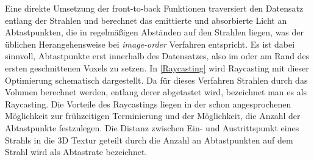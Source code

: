 \documentclass[a4paper,fontsize=12pt,toc=bib,parskip=half,ngerman]{scrartcl}
\begin{document}
Eine direkte Umsetzung der front-to-back Funktionen traversiert den Datensatz entlang der Strahlen und berechnet das emittierte und absorbierte Licht an Abtastpunkten, die in regelm\"a{\ss}igen Abst\"anden auf den Strahlen liegen, was der \"ublichen Herangehensweise bei \textit{image-order} Verfahren entspricht. Es ist dabei sinnvoll, Abtastpunkte erst innerhalb des Datensatzes, also im oder am Rand des ersten geschnittenen Voxels zu setzen. In \cref{Raycasting} wird Raycasting mit dieser Optimierung schematisch dargestellt. 
Da f\"ur dieses Verfahren Strahlen durch das Volumen berechnet werden, entlang derer abgetastet wird, bezeichnet man es als Raycasting. Die Vorteile des Raycastings liegen in der schon angesprochenen M\"oglichkeit zur fr\"uhzeitigen Terminierung und der M\"oglichkeit, die Anzahl der Abtastpunkte festzulegen. Die Distanz zwischen Ein- und Austrittspunkt eines Strahls in die 3D Textur geteilt durch die Anzahl an Abtastpunkten auf dem Strahl wird als \glq Abtastrate\grq{} bezeichnet.
\end{document}
